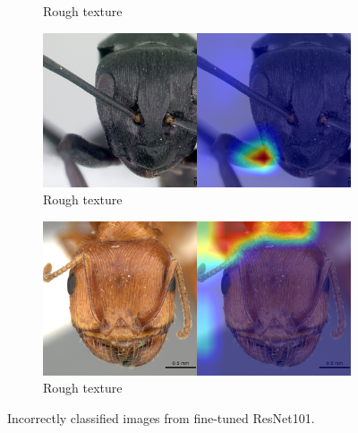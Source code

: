 \documentclass{aci}
\numberwithin{equation}{section}
\begin{document}
\begin{figure}
\begin{subfigure}{\subwidth}
        \caption*{Rough texture}
        \label{fig:incorrect_nonideal_22}
    \end{subfigure}
    \begin{subfigure}{\subwidth}
        \includegraphics[width=1\linewidth]{thesis_assets/gradcam/incorrect_nonideal/61.png}
        \caption*{Rough texture}
        \label{fig:incorrect_nonideal_61}
    \end{subfigure}
    \begin{subfigure}{\subwidth}
        \includegraphics[width=1\linewidth]{thesis_assets/gradcam/incorrect_nonideal/204.png}
        \caption*{Rough texture}
        \label{fig:incorrect_nonideal_204}
    \end{subfigure}
    \caption{Incorrectly classified images from fine-tuned ResNet101.}
    \label{fig:incorrect_images}
\end{figure}
\end{document}
